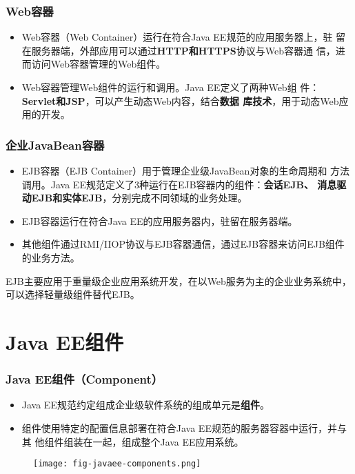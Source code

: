 \begin{frame}
  \frametitle{ Web容器} 

  \begin{itemize}[<+-| alert@+>]
  \item Web容器（Web Container）运行在符合Java EE规范的应用服务器上，驻
    留在服务器端，外部应用可以通过{\bf\Blue HTTP和HTTPS}协议与Web容器通
    信，进而访问Web容器管理的Web组件。
  \item Web容器管理Web组件的运行和调用。Java EE定义了两种Web组
    件：{\bf\Blue Servlet和JSP}，可以产生动态Web内容，结合{\bf\Blue 数据
      库技术}，用于动态Web应用的开发。
  \end{itemize}
\end{frame}

\begin{frame}
  \frametitle{ 企业JavaBean容器}
  
  \begin{itemize}
  \item EJB容器（EJB Container）用于管理企业级JavaBean对象的生命周期和
    方法调用。Java EE规范定义了3种运行在EJB容器内的组件：{\bf\Red 会话EJB、
      消息驱动EJB和实体EJB}，分别完成不同领域的业务处理。
  \item EJB容器运行在符合Java EE的应用服务器内，驻留在服务器端。
  \item 其他组件通过RMI/IIOP协议与EJB容器通信，通过EJB容器来访问EJB组件
    的业务方法。
  \end{itemize}

  {\kai\Red EJB主要应用于重量级企业应用系统开发，在以Web服务为主的企业业务系统中，
  可以选择轻量级组件替代EJB。}
\end{frame}

\section{Java EE组件}

\begin{frame}
  \frametitle{Java EE组件（Component）} 

  \begin{itemize}
  \item Java EE规范约定组成企业级软件系统的组成单元是{\bf\Red 组件}。
  \item 组件使用特定的配置信息部署在符合Java EE规范的服务器容器中运行，并与其
    他组件组装在一起，组成整个Java EE应用系统。
  \end{itemize}

  \begin{figure}
    \centering
    \texttt{[image: fig-javaee-components.png]}
  \end{figure}
\end{frame}

